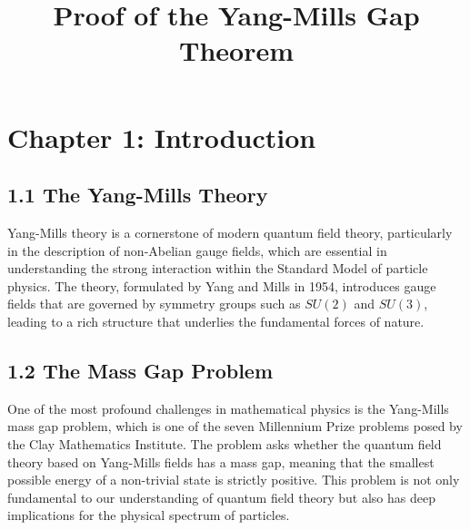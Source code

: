 \documentclass{article}
\title{Proof of the Yang-Mills Gap Theorem}
\author{}
\date{}
\begin{document}
\maketitle

\section*{Chapter 1: Introduction}

\subsection*{1.1 The Yang-Mills Theory}
Yang-Mills theory is a cornerstone of modern quantum field theory, particularly in the description of non-Abelian gauge fields, which are essential in understanding the strong interaction within the Standard Model of particle physics. The theory, formulated by Yang and Mills in 1954, introduces gauge fields that are governed by symmetry groups such as \(SU(2)\) and \(SU(3)\), leading to a rich structure that underlies the fundamental forces of nature.

\subsection*{1.2 The Mass Gap Problem}
One of the most profound challenges in mathematical physics is the Yang-Mills mass gap problem, which is one of the seven Millennium Prize problems posed by the Clay Mathematics Institute. The problem asks whether the quantum field theory based on Yang-Mills fields has a mass gap, meaning that the smallest possible energy of a non-trivial state is strictly positive. This problem is not only fundamental to our understanding of quantum field theory but also has deep implications for the physical spectrum of particles.
\end{document}
